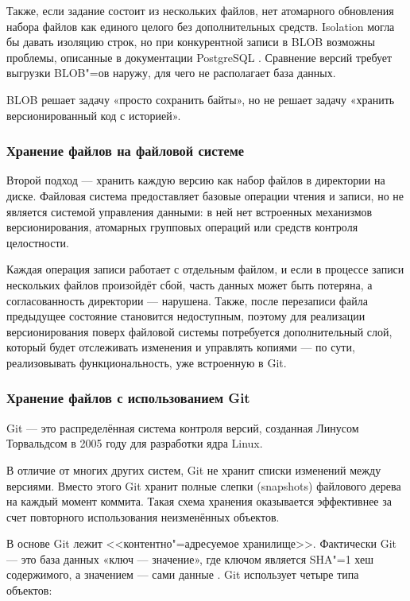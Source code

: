 \documentclass[coursework]{SCWorks}
\newcommand{\quot}[1]{<<#1>>}
\begin{document}
Также, если задание состоит из нескольких файлов, нет атомарного обновления набора файлов как единого целого без дополнительных средств. Isolation могла бы давать изоляцию строк, но при конкурентной записи в BLOB возможны проблемы, описанные в документации PostgreSQL \cite{postgresacid}. Сравнение версий требует выгрузки BLOB"=ов наружу, для чего не располагает база данных.

BLOB решает задачу «просто сохранить байты», но не решает задачу «хранить версионированный код с историей».

\subsubsection{Хранение файлов на файловой системе}

Второй подход --- хранить каждую версию как набор файлов в директории на диске. Файловая система предоставляет базовые операции чтения и записи, но не является системой управления данными: в ней нет встроенных механизмов версионирования, атомарных групповых операций или средств контроля целостности.

Каждая операция записи работает с отдельным файлом, и если в процессе записи нескольких файлов произойдёт сбой, часть данных может быть потеряна, а согласованность директории --- нарушена. Также, после перезаписи файла предыдущее состояние становится недоступным, поэтому для реализации версионирования поверх файловой системы потребуется дополнительный слой, который будет отслеживать изменения и управлять копиями --- по сути, реализовывать функциональность, уже встроенную в Git.

\subsubsection{Хранение файлов с использованием Git}

Git --- это распределённая система контроля версий, созданная Линусом Торвальдсом в 2005 году для разработки ядра Linux.

В отличие от многих других систем, Git не хранит списки изменений между версиями. Вместо этого Git хранит полные слепки (snapshots) файлового дерева на каждый момент коммита. Такая схема хранения оказывается эффективнее за счет повторного использования неизменённых объектов.

В основе Git лежит \quot{контентно"=адресуемое хранилище}. Фактически Git --- это база данных «ключ --- значение», где ключом является SHA"=1 хеш содержимого, а значением --- сами данные \cite{aosagit}. Git использует четыре типа объектов:
\end{document}
